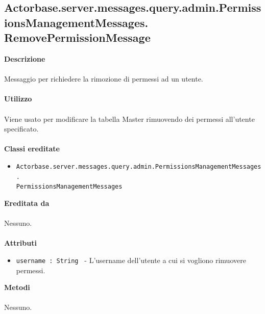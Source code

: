 \documentclass[a4paper]{article}
\begin{document}
\subsection{Actorbase.server.messages.query.admin.PermissionsManagementMessages.
\newline RemovePermissionMessage}
		\textbf{Descrizione}
			\\ \\
			Messaggio per richiedere la rimozione di permessi ad un utente.
			\\ \\
		\textbf{Utilizzo}
			\\ \\
			Viene usato per modificare la tabella Master rimuovendo dei permessi all'utente specificato.
			\\ \\
		\textbf{Classi ereditate}
			\begin{itemize}
				\item \texttt{Actorbase.server.messages.query.admin.PermissionsManagementMessages.}
				\\ \texttt{PermissionsManagementMessages}\end{itemize}
		\textbf{Ereditata da}
			\\ \\
			Nessuno.
			\\ \\
		\textbf{Attributi}
			\begin{itemize}
				\item \texttt{username : String } - L'username dell'utente a cui si vogliono rimuovere permessi.
			\end{itemize}
		\textbf{Metodi}
			\\ \\
			Nessuno.
			
\end{document}
